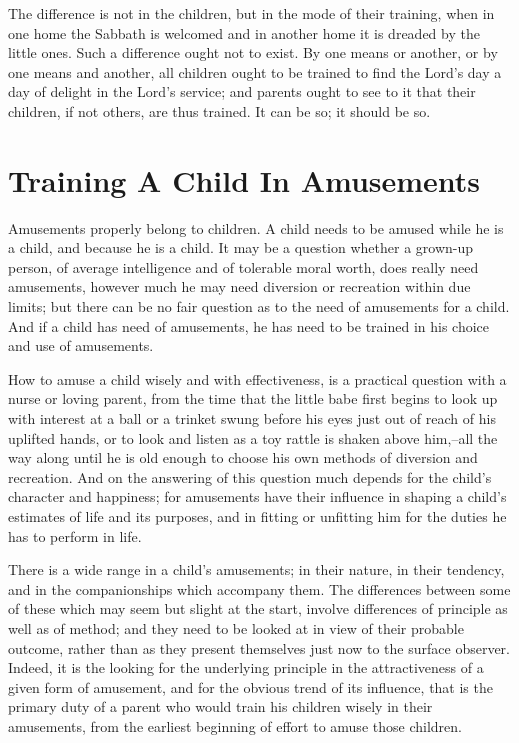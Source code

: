 \documentclass[
]{book}
\begin{document}
The difference is not in the children, but in the mode of their training, when in one home the Sabbath is welcomed and in another home it is dreaded by the little ones. Such a difference ought not to exist. By one means or another, or by one means and another, all children ought to be trained to find the Lord's day a day of delight in the Lord's service; and parents ought to see to it that their children, if not others, are thus trained. It can be so; it should be so.

\hypertarget{training-a-child-in-amusements}{%
\chapter{Training A Child In Amusements}\label{training-a-child-in-amusements}}

Amusements properly belong to children. A child needs to be amused while he is a child, and because he is a child. It may be a question whether a grown-up person, of average intelligence and of tolerable moral worth, does really need amusements, however much he may need diversion or recreation within due limits; but there can be no fair question as to the need of amusements for a child. And if a child has need of amusements, he has need to be trained in his choice and use of amusements.

How to amuse a child wisely and with effectiveness, is a practical question with a nurse or loving parent, from the time that the little babe first begins to look up with interest at a ball or a trinket swung before his eyes just out of reach of his uplifted hands, or to look and listen as a toy rattle is shaken above him,--all the way along until he is old enough to choose his own methods of diversion and recreation. And on the answering of this question much depends for the child's character and happiness; for amusements have their influence in shaping a child's estimates of life and its purposes, and in fitting or unfitting him for the duties he has to perform in life.

There is a wide range in a child's amusements; in their nature, in their tendency, and in the companionships which accompany them. The differences between some of these which may seem but slight at the start, involve differences of principle as well as of method; and they need to be looked at in view of their probable outcome, rather than as they present themselves just now to the surface observer. Indeed, it is the looking for the underlying principle in the attractiveness of a given form of amusement, and for the obvious trend of its influence, that is the primary duty of a parent who would train his children wisely in their amusements, from the earliest beginning of effort to amuse those children.
\end{document}
